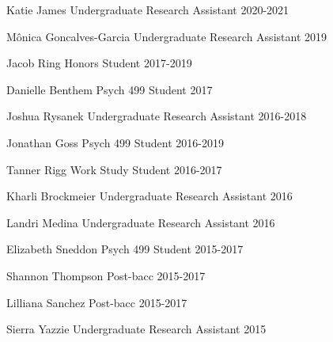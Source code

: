 \begin{cvhonors}
  \cvhonor
    {Katie James} %
    { Undergraduate Research Assistant} %
    {} %
    {2020-2021} %
    
  \cvhonor
    {M\^{o}nica Goncalves-Garcia} %
    {Undergraduate Research Assistant} %
    {} %
    {2019} %

  \cvhonor
    {Jacob Ring} %
    {Honors Student} %
    {} %
    {2017-2019} %

  \cvhonor
    {Danielle Benthem} %
    {Psych 499 Student} %
    {} %
    {2017} %

  \cvhonor
    {Joshua Rysanek} %
    {Undergraduate Research Assistant} %
    {} %
    {2016-2018} %

  \cvhonor
    {Jonathan Goss} %
    {Psych 499 Student} %
    {} %
    {2016-2019} %
    
  \cvhonor
    {Tanner Rigg} %
    {Work Study Student} %
    {} %
    {2016-2017} %
    
  \cvhonor
    {Kharli Brockmeier} %
    {Undergraduate Research Assistant} %
    {} %
    {2016} %
    
  \cvhonor
    {Landri Medina} %
    {Undergraduate Research Assistant} %
    {} %
    {2016} %
    
  \cvhonor
    {Elizabeth Sneddon} %
    {Psych 499 Student} %
    {} %
    {2015-2017} %
    
  \cvhonor
    {Shannon Thompson} %
    {Post-bacc} %
    {} %
    {2015-2017} %
    
  \cvhonor
    {Lilliana Sanchez} %
    {Post-bacc} %
    {} %
    {2015-2017} %
    
  \cvhonor
    {Sierra Yazzie} %
    {Undergraduate Research Assistant} %
    {} %
    {2015} %
\end{cvhonors}